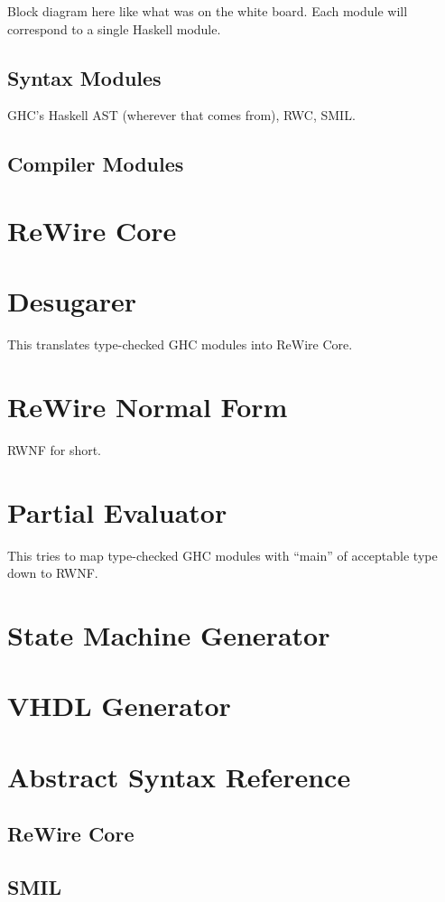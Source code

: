 \documentclass{article}[12pt]
\begin{document}
Block diagram here like what was on the white board. Each module will correspond to a single Haskell module.

\subsection{Syntax Modules}

GHC's Haskell AST (wherever that comes from), RWC, SMIL.

\subsection{Compiler Modules}

\section{ReWire Core}

\section{Desugarer}

This translates type-checked GHC modules into ReWire Core.

\section{ReWire Normal Form}

RWNF for short.

\section{Partial Evaluator}

This tries to map type-checked GHC modules with ``main'' of acceptable type down to RWNF.

\section{State Machine Generator}

\section{VHDL Generator}

\appendix

\section{Abstract Syntax Reference}

\subsection{ReWire Core}

\subsection{SMIL}
\end{document}
